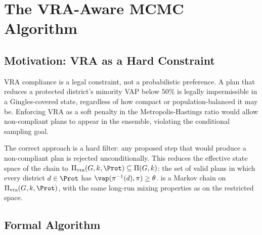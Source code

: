 \section{The VRA-Aware MCMC Algorithm}
\label{sec:algorithm}

\subsection{Motivation: VRA as a Hard Constraint}

VRA compliance is a legal constraint, not a probabilistic preference.
A plan that reduces a protected district's minority VAP below $50\%$ is legally
impermissible in a Gingles-covered state, regardless of how compact or
population-balanced it may be.
Enforcing VRA as a soft penalty in the Metropolis-Hastings ratio would allow
non-compliant plans to appear in the ensemble, violating the conditional
sampling goal.

The correct approach is a hard filter: any proposed step that would produce a
non-compliant plan is rejected unconditionally.
This reduces the effective state space of the chain to
$\Pi_{\mathrm{vra}}(G, k, \Prot) \subseteq \Pi(G, k)$: the set of valid
plans in which every district $d \in \Prot$ has
$\vap(\pi^{-1}(d), \pi) \geq \theta$.
\vr{} is a Markov chain on $\Pi_{\mathrm{vra}}(G, k, \Prot)$, with the
same long-run mixing properties as \fr{} on the restricted space.

\subsection{Formal Algorithm}

